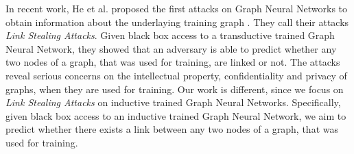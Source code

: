   In recent work, He et al. proposed the first attacks on Graph Neural Networks to obtain information about the underlaying training graph \cite{DBLP:journals/corr/abs-2005-02131}.
  They call their attacks \emph{Link Stealing Attacks}.
  Given black box access to a transductive trained Graph Neural Network, they showed that an adversary is able to predict whether any two nodes of a graph, that was used for training, are linked or not.
  The attacks reveal serious concerns on the intellectual property, confidentiality and privacy of graphs, when they are used for training.
  Our work is different, since we focus on \emph{Link Stealing Attacks} on inductive trained Graph Neural Networks.
  Specifically, given black box access to an inductive trained Graph Neural Network, we aim to predict whether there exists a link between any two nodes of a graph, that was used for training.
